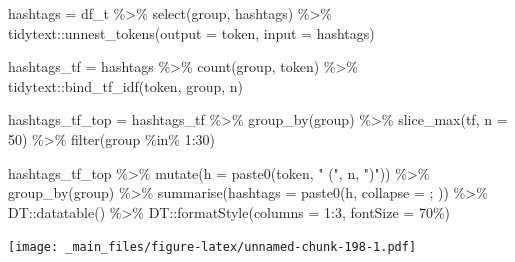 \documentclass[
]{book}
\newenvironment{Shaded}{\begin{snugshade}}{\end{snugshade}}
\newcommand{\AttributeTok}[1]{\textcolor[rgb]{0.77,0.63,0.00}{#1}}
\newcommand{\DecValTok}[1]{\textcolor[rgb]{0.00,0.00,0.81}{#1}}
\newcommand{\FunctionTok}[1]{\textcolor[rgb]{0.00,0.00,0.00}{#1}}
\newcommand{\NormalTok}[1]{#1}
\newcommand{\OtherTok}[1]{\textcolor[rgb]{0.56,0.35,0.01}{#1}}
\newcommand{\SpecialCharTok}[1]{\textcolor[rgb]{0.00,0.00,0.00}{#1}}
\newcommand{\StringTok}[1]{\textcolor[rgb]{0.31,0.60,0.02}{#1}}
\begin{document}
\begin{Shaded}
\begin{Highlighting}[]
\NormalTok{hashtags }\OtherTok{=}\NormalTok{ df\_t }\SpecialCharTok{\%\textgreater{}\%} \FunctionTok{select}\NormalTok{(group, hashtags) }\SpecialCharTok{\%\textgreater{}\%}\NormalTok{ tidytext}\SpecialCharTok{::}\FunctionTok{unnest\_tokens}\NormalTok{(}\AttributeTok{output =}\NormalTok{ token, }\AttributeTok{input =}\NormalTok{ hashtags)}

\NormalTok{hashtags\_tf }\OtherTok{=}\NormalTok{ hashtags }\SpecialCharTok{\%\textgreater{}\%} \FunctionTok{count}\NormalTok{(group, token) }\SpecialCharTok{\%\textgreater{}\%}\NormalTok{ tidytext}\SpecialCharTok{::}\FunctionTok{bind\_tf\_idf}\NormalTok{(token, group, n)}

\NormalTok{hashtags\_tf\_top }\OtherTok{=}\NormalTok{ hashtags\_tf }\SpecialCharTok{\%\textgreater{}\%} \FunctionTok{group\_by}\NormalTok{(group) }\SpecialCharTok{\%\textgreater{}\%} \FunctionTok{slice\_max}\NormalTok{(tf, }\AttributeTok{n =} \DecValTok{50}\NormalTok{) }\SpecialCharTok{\%\textgreater{}\%} \FunctionTok{filter}\NormalTok{(group }\SpecialCharTok{\%in\%} \DecValTok{1}\SpecialCharTok{:}\DecValTok{30}\NormalTok{)}
\end{Highlighting}
\end{Shaded}

\begin{Shaded}
\begin{Highlighting}[]
\NormalTok{hashtags\_tf\_top }\SpecialCharTok{\%\textgreater{}\%} 
  \FunctionTok{mutate}\NormalTok{(}\AttributeTok{h =} \FunctionTok{paste0}\NormalTok{(token, }\StringTok{" ("}\NormalTok{, n, }\StringTok{")"}\NormalTok{)) }\SpecialCharTok{\%\textgreater{}\%} 
  \FunctionTok{group\_by}\NormalTok{(group) }\SpecialCharTok{\%\textgreater{}\%} \FunctionTok{summarise}\NormalTok{(}\AttributeTok{hashtags =} \FunctionTok{paste0}\NormalTok{(h, }\AttributeTok{collapse =} \StringTok{\textquotesingle{}; \textquotesingle{}}\NormalTok{)) }\SpecialCharTok{\%\textgreater{}\%} 
\NormalTok{  DT}\SpecialCharTok{::}\FunctionTok{datatable}\NormalTok{() }\SpecialCharTok{\%\textgreater{}\%} 
\NormalTok{  DT}\SpecialCharTok{::}\FunctionTok{formatStyle}\NormalTok{(}\AttributeTok{columns =} \DecValTok{1}\SpecialCharTok{:}\DecValTok{3}\NormalTok{, }\AttributeTok{fontSize =} \StringTok{\textquotesingle{}70\%\textquotesingle{}}\NormalTok{)}
\end{Highlighting}
\end{Shaded}

\texttt{[image: \_main\_files/figure-latex/unnamed-chunk-198-1.pdf]}
\end{document}
